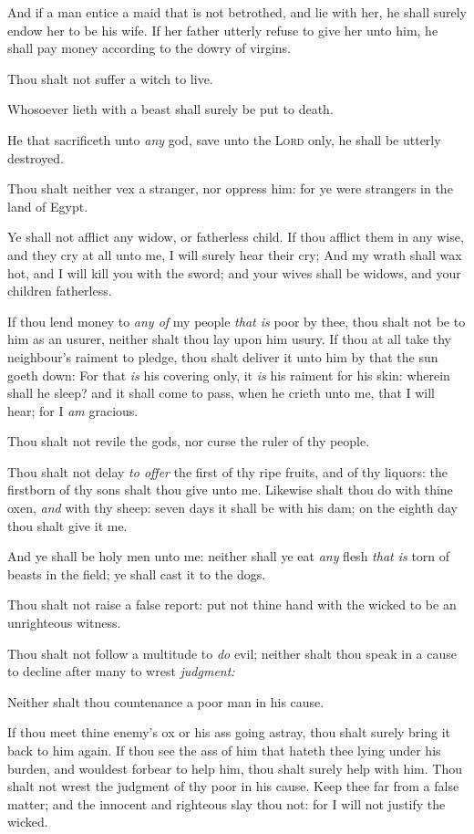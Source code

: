 \documentclass[11pt,letterpaper,oneside]{memoir}
\begin{document}
And if a man entice a maid that is not betrothed, and lie with her, he
shall surely endow her to be his wife. If her father utterly refuse to
give her unto him, he shall pay money according to the dowry of virgins.

Thou shalt not suffer a witch to live.

Whosoever lieth with a beast shall surely be put to death.

He that sacrificeth unto \emph{any} god, save unto the \textsc{Lord}
only, he shall be utterly destroyed.

Thou shalt neither vex a stranger, nor oppress him: for ye were
strangers in the land of Egypt.

Ye shall not afflict any widow, or fatherless child. If thou afflict
them in any wise, and they cry at all unto me, I will surely hear their
cry; And my wrath shall wax hot, and I will kill you with the sword; and
your wives shall be widows, and your children fatherless.

If thou lend money to \emph{any of} my people \emph{that is} poor by
thee, thou shalt not be to him as an usurer, neither shalt thou lay upon
him usury. If thou at all take thy neighbour's raiment to pledge, thou
shalt deliver it unto him by that the sun goeth down: For that \emph{is}
his covering only, it \emph{is} his raiment for his skin: wherein shall
he sleep? and it shall come to pass, when he crieth unto me, that I will
hear; for I \emph{am} gracious.

Thou shalt not revile the gods, nor curse the ruler of thy people.

Thou shalt not delay \emph{to offer} the first of thy ripe fruits, and
of thy liquors: the firstborn of thy sons shalt thou give unto me.
Likewise shalt thou do with thine oxen, \emph{and} with thy sheep: seven
days it shall be with his dam; on the eighth day thou shalt give it me.

And ye shall be holy men unto me: neither shall ye eat \emph{any} flesh
\emph{that is} torn of beasts in the field; ye shall cast it to the
dogs.

Thou shalt not raise a false report: put not thine hand with the wicked
to be an unrighteous witness.

Thou shalt not follow a multitude to \emph{do} evil; neither shalt thou
speak in a cause to decline after many to wrest \emph{judgment:}

Neither shalt thou countenance a poor man in his cause.

If thou meet thine enemy's ox or his ass going astray, thou shalt surely
bring it back to him again. If thou see the ass of him that hateth thee
lying under his burden, and wouldest forbear to help him, thou shalt
surely help with him. Thou shalt not wrest the judgment of thy poor in
his cause. Keep thee far from a false matter; and the innocent and
righteous slay thou not: for I will not justify the wicked.
\end{document}
